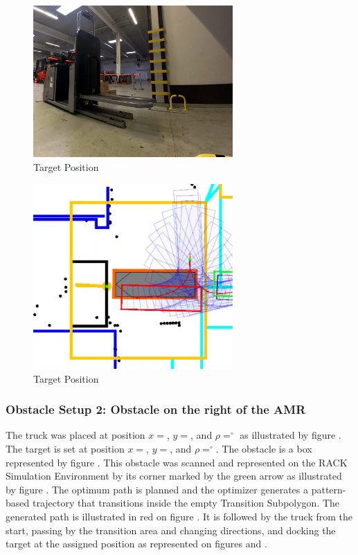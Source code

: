 \begin{figure}[H]
    \begin{center}
        \includegraphics[width=3in]{images/Chap3/Test2_ObsLeftVehic/Target_real.png} %
        \caption{Target Position}
        \label{OptResult16}
        \end{center}    
\end{figure}

\begin{figure}[H]
    \begin{center}
        \includegraphics[width=3in]{images/Chap3/Test2_ObsLeftVehic/Target_simu.png} %
        \caption{Target Position}
        \label{OptResult17}
        \end{center}    
\end{figure}

\subsubsection{Obstacle Setup 2: Obstacle on the right of the AMR}

The truck was placed at position \(x = \), \(y = \), and \(\rho = ^\circ\) as illustrated by figure 
. The target is set at position \(x = \), \(y = \), and \(\rho = ^\circ\).
The obstacle is a box represented by figure . 
This obstacle was scanned and represented on the RACK Simulation 
Environment by its corner marked by the green arrow as illustrated by figure .
The optimum path is planned and the optimizer generates a pattern-based trajectory that transitions
inside the empty Transition Subpolygon. 
The generated path is illustrated in red on figure . It is followed 
by the truck from the start, passing by the transition area and changing directions, and docking the 
target at the assigned position as represented on figures  and . 

